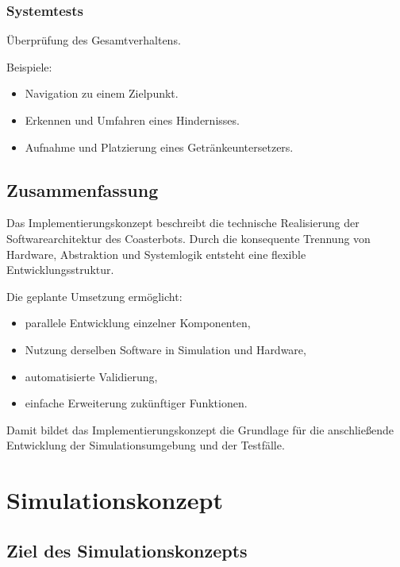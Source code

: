 \documentclass[
  a4paper,
  12pt,
  DIV=12,        %
  parskip=half,  %
  headings=small %
]{scrartcl}
\theoremstyle{definition}
\providecommand{\tightlist}{%
  \setlength{\itemsep}{0pt}\setlength{\parskip}{0pt}}
\theoremstyle{definition}
\begin{document}
\subsubsection{Systemtests}\label{systemtests}

Überprüfung des Gesamtverhaltens.

Beispiele:

\begin{itemize}
\tightlist
\item
  Navigation zu einem Zielpunkt.
\item
  Erkennen und Umfahren eines Hindernisses.
\item
  Aufnahme und Platzierung eines Getränkeuntersetzers.
\end{itemize}

\subsection{Zusammenfassung}\label{zusammenfassung-3}

Das Implementierungskonzept beschreibt die technische Realisierung der
Softwarearchitektur des Coasterbots. Durch die konsequente Trennung von
Hardware, Abstraktion und Systemlogik entsteht eine flexible
Entwicklungsstruktur.

Die geplante Umsetzung ermöglicht:

\begin{itemize}
\tightlist
\item
  parallele Entwicklung einzelner Komponenten,
\item
  Nutzung derselben Software in Simulation und Hardware,
\item
  automatisierte Validierung,
\item
  einfache Erweiterung zukünftiger Funktionen.
\end{itemize}

Damit bildet das Implementierungskonzept die Grundlage für die
anschließende Entwicklung der Simulationsumgebung und der Testfälle.

\section{Simulationskonzept}\label{simulationskonzept}

\subsection{Ziel des
Simulationskonzepts}\label{ziel-des-simulationskonzepts}
\end{document}
